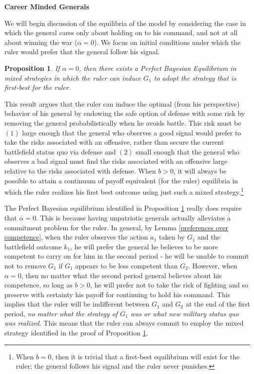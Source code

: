 \documentclass[11pt,]{article}
\newtheorem{proposition}[]{Proposition}
\begin{document}
\begin{center}
\textbf{\Large{Career Minded Generals}}\normalsize\\
\end{center}We will begin discussion of the equilibria of the model by considering the case in which the general cares only about holding on to his command, and not at all about winning the war ($\alpha=0$).  
We focus on initial conditions under which the ruler would prefer that the general follow his signal.  
\begin{proposition}If $\alpha=0$, then there exists a Perfect Bayesian Equilibrium in mixed strategies in which the ruler can induce $G_1$ to adopt the strategy that is first-best for the ruler.\label{the ruler can get his first best}
\end{proposition}
This result argues that the ruler can induce the optimal (from his perspective) behavior of his general by endowing the safe option of defense with some risk by removing the general probabilistically when he avoids battle.  This risk must be $(1)$ large enough that the general who observes a good signal would prefer to take the risks associated with an offensive, rather than secure the current battlefield status quo via defense and $(2)$ small enough that the general who observes a bad signal must find the risks associated with an offensive large relative to the risks associated with defense.  When $b>0$, it will always be possible to attain a continuum of payoff equivalent (for the ruler) equilibria in which the ruler realizes his first best outcome using just such a mixed strategy.\footnote{\normalsize\doublespacing When $b=0$, then it is trivial that a first-best equilibrium will exist for the ruler; the general follows his signal and the ruler never punishes.}



The Perfect Bayesian equilibrium identified in Proposition \ref{the ruler can get his first best} really does require that $\alpha=0$.  This is because having unpatriotic generals actually alleviates a commitment problem for the ruler.  In general, by Lemma \ref{preferences over competence}, when the ruler observes the action $a_1$ taken by $G_1$ and the battlefield outcome $k_1$, he will prefer the general he believes to be more competent to carry on for him in the second period - he will be unable to commit not to remove $G_1$ if $G_1$ appears to be less competent than $G_2$.  However, when $\alpha=0$, then no matter what the second period general believes about his competence, so long as $b>0$, he will prefer not to take the risk of fighting and so preserve with certainty his payoff for continuing to hold his command.  This implies that the ruler will be indifferent between $G_1$ and $G_2$ at the end of the first period, \textit{no matter what the strategy of $G_1$ was or what new military status quo was realized}.  This means that the ruler can always commit to employ the mixed strategy identified in the proof of Proposition \ref{the ruler can get his first best}.
\end{document}
